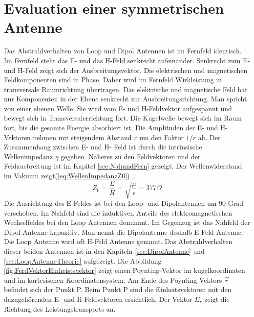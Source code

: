 
\newpage
\chapter{Evaluation einer symmetrischen Antenne}

Das Abstrahlverhalten von Loop und Dipol Antennen ist im Fernfeld identisch. Im Fernfeld steht das E- und das H-Feld senkrecht aufeinander. Senkrecht zum E- und H-Feld zeigt sich der Ausbreitungsvektor. Die elektrischen und
magnetischen Feldkomponenten sind in Phase. Daher wird im Fernfeld Wirkleistung in transversale Raumrichtung
übertragen. Das elektrische und magnetische Feld hat nur Komponenten in der Ebene senkrecht zur Ausbreitungsrichtung.
Man spricht von einer ebenen Welle. Sie wird vom E- und H-Feldvektor aufgespannt und bewegt sich in
Transversalerrichtung fort. Die Kugelwelle bewegt sich im Raum fort, bis die gesamte Energie absorbiert ist. Die Amplituden der E- und H-Vektoren
nehmen mit steigendem Abstand $r$ um den Faktor $1/r$ ab. Der Zusammenhang zwischen E- und H- Feld ist
durch die intrinsische Wellenimpedanz $\eta$ gegeben. Näheres zu den Feldvektoren und der Feldausbreitung ist im Kapitel \ref{sec:NahundFern} gezeigt. Der Wellenwiderstand im Vakuum zeigt(\ref{eq:WellenImpedanzZ0}) \cite{Harrington-TimeHarmonic},\cite{Emant}.
\begin{equation}\label{eq:WellenImpedanzZ0}
Z_{0}=\dfrac{E}{H}=\sqrt{\dfrac{\mu}{\epsilon}}=377\Omega
\end{equation}
Die Ausrichtung des E-Feldes ist bei den Loop- und Dipolantennen um 90 Grad verschoben. 
Im Nahfeld sind die induktiven Anteile des elektromagnetischen Wechselfeldes bei den Loop Antennen dominant. Im Gegenzug ist das Nahfeld der Dipol Antenne kapazitiv. Man nennt die Dipolantenne deshalb E-Feld Antenne. Die Loop Antenne wird oft H-Feld Antenne genannt. Das Abstrahlverhalten dieser beiden Antennen ist in den Kapiteln \ref{sec:DipolAntenne} und \ref{sec:LoopAntenneTheorie} aufgezeigt. Die Abbildung \ref{fig:FerdVektorEinheistsvektor} zeigt einen Poynting-Vektor im kugelkoordinaten und im kartesischen Koordinatensystem. Am Ende des Poynting-Vektors $\vec{r}$ befindet sich der Punkt P. Beim Punkt P sind die Einheitsvektoren mit den dazugehörenden E- und H-Feldvektoren ersichtlich\cite{Emant}. Der Vektor ${E}_r$ zeigt die Richtung des Leistungstransports an.\\



